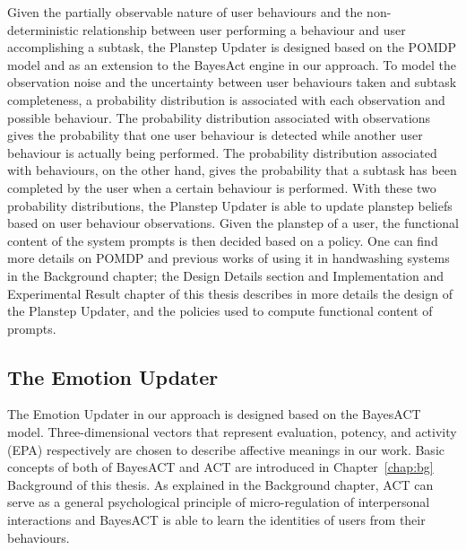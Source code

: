Given the partially observable nature of user behaviours and the non-deterministic relationship between user performing a behaviour and user accomplishing a subtask, the Planstep Updater is designed based on the POMDP model and as an extension to the BayesAct engine \cite{hoey2013bayesian} in our approach. To model the observation noise and the uncertainty between user behaviours taken and subtask completeness, a probability distribution is associated with each observation and possible behaviour. The probability distribution associated with observations gives the probability that one user behaviour is detected while another user behaviour is actually being performed. The probability distribution associated with behaviours, on the other hand, gives the probability that a subtask has been completed by the user when a certain behaviour is performed. With these two probability distributions, the Planstep Updater is able to update planstep beliefs based on user behaviour observations. Given the planstep of a user, the functional content of the system prompts is then decided based on a policy. One can find more details on POMDP and previous works of using it in handwashing systems in the Background chapter; the Design Details section and Implementation and Experimental Result chapter of this thesis describes in more details the design of the Planstep Updater, and the policies used to compute functional content of prompts.

\subsection{The Emotion Updater}

The Emotion Updater in our approach is designed based on the BayesACT model. Three-dimensional vectors that represent evaluation, potency, and activity (EPA) respectively are chosen to describe affective meanings in our work. Basic concepts of both of BayesACT and ACT are introduced in Chapter~\ref{chap:bg} Background of this thesis. As explained in the Background chapter, ACT can serve as a general psychological principle of micro-regulation of interpersonal interactions and BayesACT is able to learn the identities of users from their behaviours.

